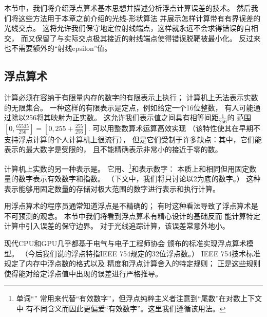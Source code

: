 本节中，我们将介绍浮点算术基本思想并描述分析浮点计算误差的技术。
然后我们将这些方法用于本章之前介绍的光线-形状算法
并展示怎样计算带有有界误差的光线交点。
这将允许我们保守地定位射线端点，这样就永远不会求得错误的自相交，
而又保留了与实际交点极其接近的射线端点使得错误脱靶被最小化。
反过来也不需要额外的“射线epsilon”值。

\subsection{浮点算术}\label{sub:浮点算术}
计算必须在容纳于有限量内存的数字的有限表示上执行；
计算机上无法表示实数的无限集合。
一种这样的有限表示是定点，例如给定一个16位整数，
有人可能通过除以256将其映射为正实数。
这允许我们表示值之间具有相等间距$\displaystyle\frac{1}{256}$的
范围$\displaystyle\left[0,\frac{65535}{256}\right]=\left[0,255+\frac{255}{256}\right]$.
可以用整数算术运算高效实现
（该特性使其在早期不支持浮点计算的个人计算机上很流行），
但是它们受制于许多缺点：其中，它们能表示的最大数字是受限的，
且不能精确表示非常小的接近于零的数。

计算机上实数的另一种表示是。
它用、\footnote{单词“\protect{}”
    常用来代替“有效数字”，但浮点纯粹主义者注意到“尾数”在对数上下文中
    有不同含义而因此更偏爱“有效数字”。这里我们遵循该用法。}和表示数字：
本质上和相同但用固定数量的数字表示有效数字和指数。
（下文中，我们将只讨论以2为底的数字。）
这种表示能够用固定数量的存储对极大范围的数字进行表示和执行计算。

用浮点算术的程序员通常知道浮点是不精确的；
有时这种看法导致了浮点算术是不可预测的观念。
本节中我们将看到浮点算术有精心设计的基础反而
能计算特定计算中引入误差的保守边界。
对于光线追踪计算，该误差常意外地小。

现代CPU和GPU几乎都基于电气与电子工程师协会
颁布的标准\parencite*{10.1109/IEEESTD.1985.82928,10.1109/IEEESTD.2008.4610935}实现浮点算术模型。
（今后我们说的浮点特指IEEE 754规定的32位浮点数。）
IEEE 754技术标准规定了内存中浮点数的格式以及
精度和浮点计算舍入的特定规则；
正是这些规则使得能对给定浮点值中出现的误差进行严格推导。

